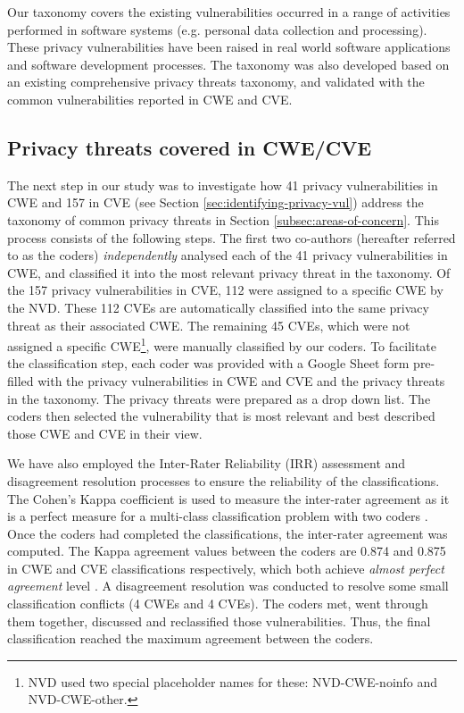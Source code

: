Our taxonomy covers the existing vulnerabilities occurred in a range of activities performed in software systems (e.g. personal data collection and processing). These privacy vulnerabilities have been raised in real world software applications and software development processes. The taxonomy was also developed based on an existing comprehensive privacy threats taxonomy, and validated with the common vulnerabilities reported in CWE and CVE.

\subsection{Privacy threats covered in CWE/CVE} \label{subsec:addressing-privacy-concerns}

The next step in our study was to investigate how 41 privacy vulnerabilities in CWE and 157 in CVE (see Section \ref{sec:identifying-privacy-vul}) address the taxonomy of common privacy threats in Section \ref{subsec:areas-of-concern}. This process consists of the following steps. The first two co-authors (hereafter referred to as the coders) \emph{independently} analysed each of the 41 privacy vulnerabilities in CWE, and classified it into the most relevant privacy threat in the taxonomy. Of the 157 privacy vulnerabilities in CVE, 112 were assigned to a specific CWE by the NVD. These 112 CVEs are automatically classified into the same privacy threat as their associated CWE. The remaining 45 CVEs, which were not assigned a specific CWE\footnote{NVD used two special placeholder names for these: NVD-CWE-noinfo and NVD-CWE-other.}, were manually classified by our coders. To facilitate the classification step, each coder was provided with a Google Sheet form pre-filled with the privacy vulnerabilities in CWE and CVE and the privacy threats in the taxonomy. The privacy threats were prepared as a drop down list. The coders then selected the vulnerability that is most relevant and best described those CWE and CVE in their view.

We have also employed the Inter-Rater Reliability (IRR) assessment and disagreement resolution processes to ensure the reliability of the classifications. The Cohen's Kappa coefficient is used to measure the inter-rater agreement as it is a perfect measure for a multi-class classification problem with two coders \cite{Hallgren}. Once the coders had completed the classifications, the inter-rater agreement was computed. The Kappa agreement values between the coders are 0.874 and 0.875 in CWE and CVE classifications respectively, which both achieve \emph{almost perfect agreement} level \cite{Viera2005}. A disagreement resolution was conducted to resolve some small classification conflicts (4 CWEs and 4 CVEs). The coders met, went through them together, discussed and reclassified those vulnerabilities. Thus, the final classification reached the maximum agreement between the coders.

